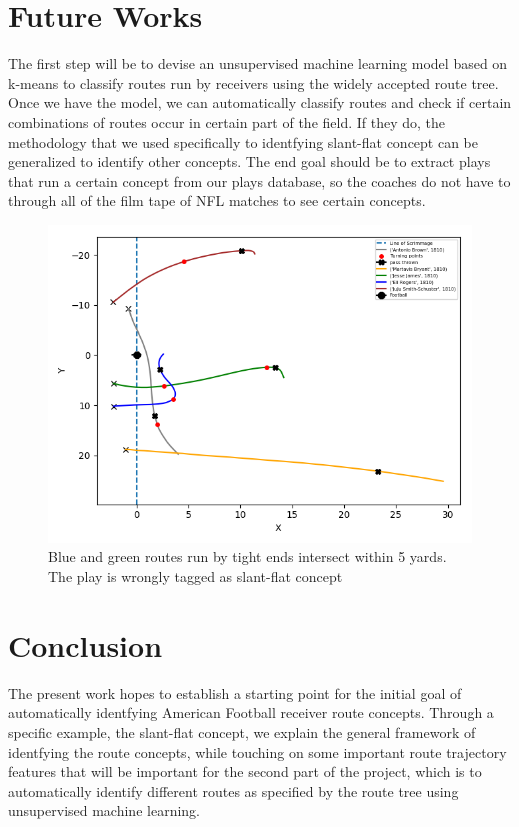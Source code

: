\documentclass[12pt,oneside]{dukestatscithesis}
\theoremstyle{definition}
\theoremstyle{definition}
\theoremstyle{definition}
\theoremstyle{remark}
\begin{document}
\section{Future Works}\label{future-works}

The first step will be to devise an unsupervised machine learning model
based on k-means to classify routes run by receivers using the widely
accepted route tree. Once we have the model, we can automatically
classify routes and check if certain combinations of routes occur in
certain part of the field. If they do, the methodology that we used
specifically to identfying slant-flat concept can be generalized to
identify other concepts. The end goal should be to extract plays that
run a certain concept from our plays database, so the coaches do not
have to through all of the film tape of NFL matches to see certain
concepts.
\begin{figure}
\includegraphics[width=8.89in,angle=360, scale=0.6]{figure/1810} \caption{Blue and green routes run by tight ends intersect within 5 yards. The play is wrongly tagged as slant-flat concept}\label{fig:slantflat3}
\end{figure}
\section{Conclusion}\label{conclusion}

The present work hopes to establish a starting point for the initial
goal of automatically identfying American Football receiver route
concepts. Through a specific example, the slant-flat concept, we explain
the general framework of identfying the route concepts, while touching
on some important route trajectory features that will be important for
the second part of the project, which is to automatically identify
different routes as specified by the route tree using unsupervised
machine learning.
\end{document}
